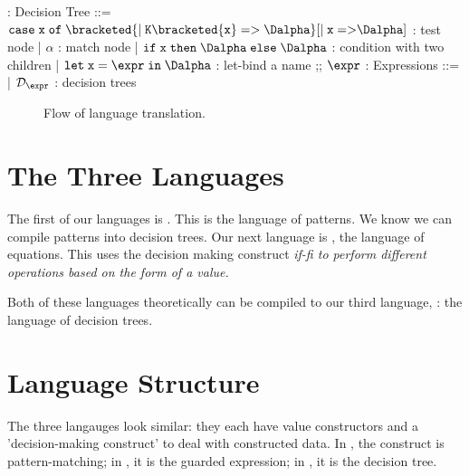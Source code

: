 \documentclass[]{article}
\begin{document}
\begin{center}
    \begin{bnf}
        \Dalpha : \textsf{Decision Tree} ::= 
        $\tt{case}\; x\; \tt{of}\; 
        \bracketed{\vert\; K\bracketed{x}\; \tt{=>}\; \Dalpha}
        [\vert\; x\; \tt{=>} \Dalpha]$ : test node 
        | $\alpha$ : match node 
        | $\tt{if}\; x\; \tt{then}\; \Dalpha\; \tt{else}\; \Dalpha$ : condition with two children 
        | $\tt{let}\; x\; \tt{=}\; \expr\; \tt{in}\; \Dalpha$ : let-bind a name
        ;;
        $\expr$ : \textsf{Expressions} ::=
        | $\mathcal{D}_{\expr}$ : decision trees 
    \end{bnf}
\end{center}

\bigskip
\begin{figure}[H]
    \centering
    \caption{Flow of language translation.}
    \label{fig:graph}
\end{figure}

\section{The Three Languages}

The first of our languages is {\PPlus}. This is the language of patterns. We know
we can compile patterns into decision trees. Our next language is {\VMinus}, the
language of equations. This uses the decision making construct \it{if-fi} to
perform different operations based on the form of a value. 

Both of these languages theoretically can be compiled to our third language,
{\D}: the language of decision trees. 

\bigskip

\section{Language Structure}

The three langauges look similar: they each have value constructors and 
a 'decision-making construct' to deal with constructed data. In {\PPlus}, the 
construct is pattern-matching; in {\VMinus}, it is the guarded expression; 
in {\D}, it is the decision tree. 
\end{document}
